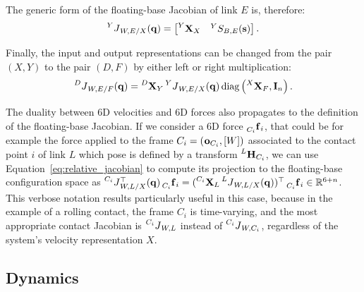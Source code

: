 \begin{definition*}
\label{definition:link_jacobian}
%
The generic form of the floating-base Jacobian of link $E$ is, therefore:
\begin{equation}
    \label{eq:relative_jacobian}
    \jac[Y]_{W,E/X}(\Qu) =
    \begin{bmatrix}
        \transvel[Y]_X & {}^Y S_{B,E}(\Shape)
    \end{bmatrix}
.
\end{equation}
%
\end{definition*}

Finally, the input and output representations can be changed from the pair $(X, Y)$ to the pair $(D, F)$ by either left or right multiplication:
%
\begin{equation}
    \label{eq:jacobian_change_of_representation}
    \jac[D]_{W,E/F}(\Qu) = \transvel[D]_Y \jac[Y]_{W,E/X}(\Qu) \operatorname{diag}\left(\transvel[X]_F, \eye_n \right)
    .
\end{equation}

\begin{remark}
\label{remark:jacobian_and_6d_forces}
%
The duality between 6D velocities and 6D forces also propagates to the definition of the floating-base Jacobian.
If we consider a 6D force $\forcesix[C_i]_i$, that could be for example the force applied to the frame $C_i = (\ori_{C_i}, [W])$ associated to the contact point $i$ of link $L$ which pose is defined by a transform $\homo[L]_{C_i}$, we can use Equation~\eqref{eq:relative_jacobian} to compute its projection to the floating-base configuration space as $\jac[C_i]_{W,L/X}^\top(\Qu) \forcesix[C_i]_i = (\transvel[C_i]_L \jac[L]_{W,L/X}(\Qu))^\top \forcesix[C_i]_i \in \realn^{6+n}$.
This verbose notation results particularly useful in this case, because in the example of a rolling contact, the frame $C_i$ is time-varying, and the most appropriate contact Jacobian is $\jac[C_i]_{W,L}$ instead of $\jac[C_i]_{W, C_i}$, regardless of the system's velocity representation $X$.
%
\end{remark}

\newpage
\subsection{Dynamics}
\label{sec:multibody_dynamics}

